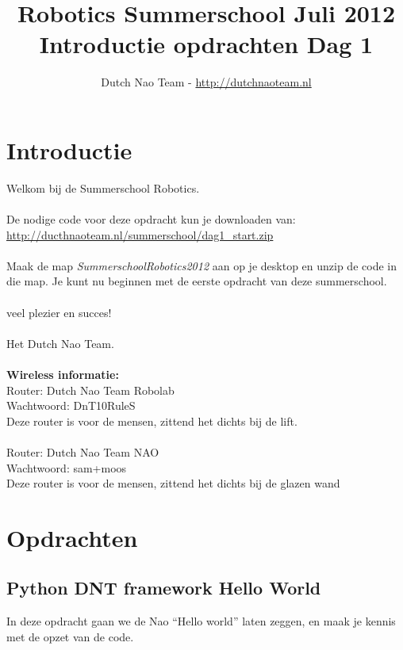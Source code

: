 \documentclass[a4paper]{article}
\title{\textbf{Robotics Summerschool Juli 2012} \\ Introductie opdrachten Dag 1}
\author{Dutch Nao Team - \url{http://dutchnaoteam.nl}}
\date{}
\begin{document}
\maketitle

\section{Introductie}
Welkom bij de Summerschool Robotics.\\
\\
De nodige code voor deze opdracht kun je downloaden van:\\ \url{http://ducthnaoteam.nl/summerschool/dag1_start.zip}\\
\\
Maak de map \textit{SummerschoolRobotics2012} aan op je desktop en unzip de code in die map. Je kunt nu beginnen met de eerste opdracht van deze summerschool. \\
\\
veel plezier en succes!\\
\\
Het Dutch Nao Team.\\
\\
\textbf{Wireless informatie:}\\
Router:  Dutch Nao Team Robolab\\
Wachtwoord: DnT10RuleS\\
Deze router is voor de mensen, zittend het dichts bij de lift.\\
\\
Router:  Dutch Nao Team NAO\\
Wachtwoord: sam+moos\\
Deze router is voor de mensen, zittend het dichts bij de glazen wand




\tableofcontents

\newpage


\section{Opdrachten}

\subsection{Python DNT framework Hello World}
In deze opdracht gaan we de Nao ``Hello world'' laten zeggen, en maak je kennis met de opzet van de code.
\end{document}
